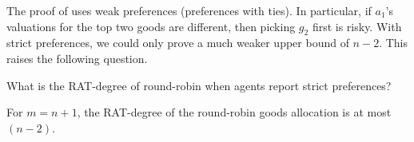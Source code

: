 




\fi

The proof of  uses weak preferences (preferences with ties). In particular, if $a_1$'s valuations for the top two goods are different, then picking $g_2$ first is risky.
With strict preferences, we could only prove a much weaker upper bound of $n-2$. This raises the following question.
\begin{open}
    What is the RAT-degree of round-robin when agents  report strict preferences?
\end{open}


\iffalse
\begin{claim}
    For $m = n+1$, the RAT-degree of the round-robin goods allocation is at most $(n-2)$.
\end{claim}

